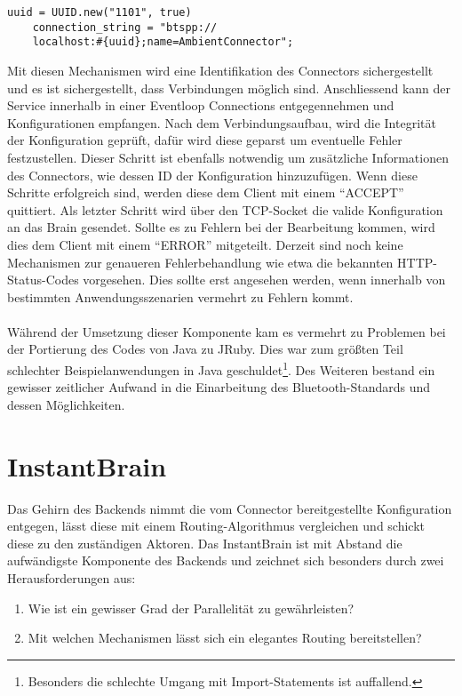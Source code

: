 \lstset{language=Ruby}
\begin{lstlisting}[caption=Erzeugen einer UUID, captionpos=b]
	uuid = UUID.new("1101", true)
	connection_string = "btspp://		  
	localhost:#{uuid};name=AmbientConnector";	
\end{lstlisting}
Mit diesen Mechanismen wird eine Identifikation des Connectors sichergestellt und es ist sichergestellt, dass Verbindungen möglich sind. Anschliessend kann der Service innerhalb in einer Eventloop Connections entgegennehmen und Konfigurationen empfangen. Nach dem Verbindungsaufbau, wird die Integrität der Konfiguration geprüft, dafür wird diese geparst um eventuelle Fehler festzustellen. Dieser Schritt ist ebenfalls notwendig um zusätzliche Informationen des Connectors, wie dessen ID der Konfiguration hinzuzufügen. Wenn diese Schritte erfolgreich sind, werden diese dem Client mit einem "`ACCEPT"' quittiert. 
Als letzter Schritt wird über den TCP-Socket die valide Konfiguration an das Brain gesendet. 
Sollte es zu Fehlern bei der Bearbeitung kommen, wird dies dem Client mit einem "`ERROR"'	 mitgeteilt. Derzeit sind noch keine Mechanismen zur genaueren Fehlerbehandlung wie etwa die bekannten HTTP-Status-Codes vorgesehen. Dies sollte erst angesehen werden, wenn innerhalb von bestimmten Anwendungsszenarien vermehrt zu Fehlern kommt. 
\\\\
Während der Umsetzung dieser Komponente kam es vermehrt zu Problemen bei der Portierung des Codes von Java zu JRuby. Dies war zum größten Teil schlechter Beispielanwendungen in Java geschuldet\footnote{Besonders die schlechte Umgang mit Import-Statements ist auffallend.}. Des Weiteren bestand ein gewisser zeitlicher Aufwand in die Einarbeitung des Bluetooth-Standards und dessen Möglichkeiten. 

\section{InstantBrain}
Das Gehirn des Backends nimmt die vom Connector bereitgestellte Konfiguration entgegen, lässt diese mit einem Routing-Algorithmus  vergleichen und schickt diese zu den zuständigen Aktoren. 
Das InstantBrain ist mit Abstand die aufwändigste Komponente des Backends und zeichnet sich besonders durch zwei Herausforderungen aus: 
\begin{enumerate}
     \item Wie ist ein gewisser Grad der Parallelität zu gewährleisten? 
     \item Mit welchen Mechanismen lässt sich ein elegantes Routing bereitstellen? 
\end{enumerate}

